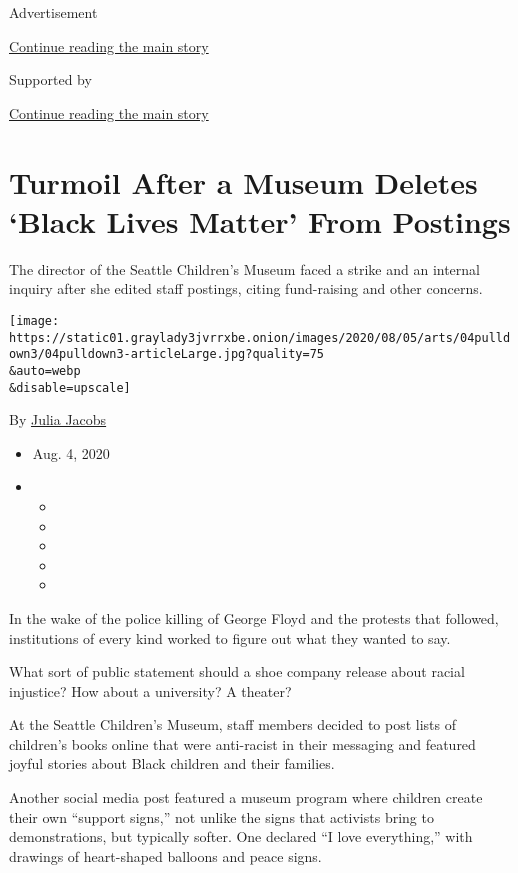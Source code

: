 Advertisement

\protect\hyperlink{after-top}{Continue reading the main story}

Supported by

\protect\hyperlink{after-sponsor}{Continue reading the main story}

\hypertarget{turmoil-after-a-museum-deletes-black-lives-matter-from-postings}{%
\section{Turmoil After a Museum Deletes `Black Lives Matter' From
Postings}\label{turmoil-after-a-museum-deletes-black-lives-matter-from-postings}}

The director of the Seattle Children's Museum faced a strike and an
internal inquiry after she edited staff postings, citing fund-raising
and other concerns.

\texttt{[image: https://static01.graylady3jvrrxbe.onion/images/2020/08/05/arts/04pulldown3/04pulldown3-articleLarge.jpg?quality=75\\\&auto=webp\\\&disable=upscale]}

By \href{https://www.nytimes3xbfgragh.onion/by/julia-jacobs}{Julia
Jacobs}

\begin{itemize}
\item
  Aug. 4, 2020
\item
  \begin{itemize}
  \item
  \item
  \item
  \item
  \item
  \end{itemize}
\end{itemize}

In the wake of the police killing of George Floyd and the protests that
followed, institutions of every kind worked to figure out what they
wanted to say.

What sort of public statement should a shoe company release about racial
injustice? How about a university? A theater?

At the Seattle Children's Museum, staff members decided to post lists of
children's books online that were anti-racist in their messaging and
featured joyful stories about Black children and their families.

Another social media post featured a museum program where children
create their own ``support signs,'' not unlike the signs that activists
bring to demonstrations, but typically softer. One declared ``I love
everything,'' with drawings of heart-shaped balloons and peace signs.

